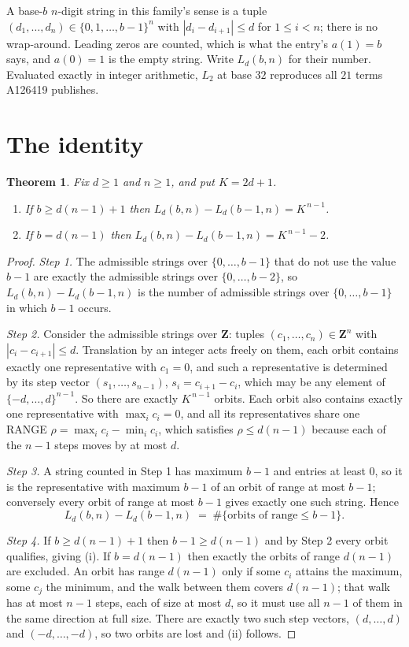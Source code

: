 \documentclass[11pt,a4paper]{article}
\theoremstyle{plain}
\newtheorem{theorem}{Theorem}
\theoremstyle{definition}
\begin{document}
A base-$b$ $n$-digit string in this family's sense is a tuple
$(d_1,\dots,d_n)\in\{0,1,\dots,b-1\}^{n}$ with $|d_i-d_{i+1}|\le d$ for $1\le i<n$; there
is no wrap-around. Leading zeros are counted, which is what the entry's $a(1)=b$ says, and
$a(0)=1$ is the empty string. Write $L_d(b,n)$ for their number. Evaluated exactly in integer
arithmetic, $L_{2}$ at base $32$ reproduces all $21$ terms A126419 publishes.

\section{The identity}

\begin{theorem}
Fix $d\ge1$ and $n\ge1$, and put $K=2d+1$.
\begin{enumerate}
\item[(i)] If $b\ge d(n-1)+1$ then $L_d(b,n)-L_d(b-1,n)=K^{\,n-1}$.
\item[(ii)] If $b=d(n-1)$ then $L_d(b,n)-L_d(b-1,n)=K^{\,n-1}-2$.
\end{enumerate}
\end{theorem}

\begin{proof}
\emph{Step 1.} The admissible strings over $\{0,\dots,b-1\}$ that do not use the value $b-1$
are exactly the admissible strings over $\{0,\dots,b-2\}$, so $L_d(b,n)-L_d(b-1,n)$ is the
number of admissible strings over $\{0,\dots,b-1\}$ in which $b-1$ occurs.

\emph{Step 2.} Consider the admissible strings over $\mathbf{Z}$: tuples
$(c_1,\dots,c_n)\in\mathbf{Z}^{n}$ with $|c_i-c_{i+1}|\le d$. Translation by an integer acts
freely on them, each orbit contains exactly one representative with $c_1=0$, and such a
representative is determined by its step vector $(s_1,\dots,s_{n-1})$, $s_i=c_{i+1}-c_i$,
which may be any element of $\{-d,\dots,d\}^{n-1}$. So there are exactly $K^{\,n-1}$ orbits.
Each orbit also contains exactly one representative with $\max_i c_i=0$, and all its
representatives share one RANGE $\rho=\max_ic_i-\min_ic_i$, which satisfies
$\rho\le d(n-1)$ because each of the $n-1$ steps moves by at most $d$.

\emph{Step 3.} A string counted in Step 1 has maximum $b-1$ and entries at least $0$, so it is
the representative with maximum $b-1$ of an orbit of range at most $b-1$; conversely every orbit
of range at most $b-1$ gives exactly one such string. Hence
\[
L_d(b,n)-L_d(b-1,n)\;=\;\#\{\text{orbits of range}\le b-1\} .
\]

\emph{Step 4.} If $b\ge d(n-1)+1$ then $b-1\ge d(n-1)$ and by Step 2 every orbit qualifies,
giving (i). If $b=d(n-1)$ then exactly the orbits of range $d(n-1)$ are excluded. An orbit has
range $d(n-1)$ only if some $c_i$ attains the maximum, some $c_j$ the minimum, and the walk
between them covers $d(n-1)$; that walk has at most $n-1$ steps, each of size at most $d$, so it
must use all $n-1$ of them in the same direction at full size. There are exactly two such step
vectors, $(d,\dots,d)$ and $(-d,\dots,-d)$, so two orbits are lost and (ii) follows.
\end{proof}
\end{document}
